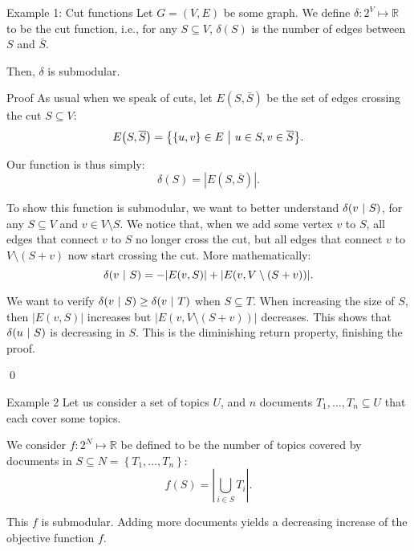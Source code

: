 \documentclass[a4paper]{article}
\begin{document}
\begin{parag}{Example 1: Cut functions}
    Let $G = \left(V, E\right)$ be some graph. We define $\delta: 2^V \mapsto \mathbb{R}$ to be the cut function, i.e., for any $S \subseteq V$, $\delta\left(S\right)$ is the number of edges between $S$ and $\bar{S}$.

    Then, $\delta$ is submodular.

    \begin{subparag}{Proof}
        As usual when we speak of cuts, let $E\left(S, \bar{S}\right)$ be the set of edges crossing the cut $S \subseteq V$: 
        \[E\left(S, \bar{S}\right) = \left\{\left\{u, v\right\} \in E \suchthat u \in S, v \in \bar{S}\right\}.\]
 
        Our function is thus simply: 
        \[\delta\left(S\right) = \left|E\left(S, \bar{S}\right)\right|.\]

        To show this function is submodular, we want to better understand $\delta\left(v \suchthat S\right)$, for any $S \subseteq V$ and $v \in V \setminus S$. We notice that, when we add some vertex $v$ to $S$, all edges that connect $v$ to $S$ no longer cross the cut, but all edges that connect $v$ to $V \setminus \left(S + v\right)$ now start crossing the cut. More mathematically:
        \[\delta\left(v \suchthat S\right) =  - \left|E\left(v, S\right)\right| + \left|E\left(v, V \setminus \left(S + v\right)\right)\right|.\]
        
        We want to verify $\delta\left(v \suchthat S\right) \geq \delta\left(v \suchthat T\right)$ when $S \subseteq T$. When increasing the size of $S$, then $\left|E\left(v, S\right)\right|$ increases but $\left|E\left(v, V \setminus \left(S + v\right)\right)\right|$ decreases. This shows that $\delta\left(u \suchthat S\right)$ is decreasing in $S$. This is the diminishing return property, finishing the proof.

        \qed
    \end{subparag}
\end{parag}

\begin{parag}{Example 2}
    Let us consider a set of topics $U$, and $n$ documents $T_1, \ldots, T_n \subseteq U$ that each cover some topics.

    We consider $f: 2^N \mapsto \mathbb{R}$ be defined to be the number of topics covered by documents in $S \subseteq N = \left\{T_1, \ldots, T_n\right\}$: 
    \[f\left(S\right) = \left|\bigcup_{i \in S} T_i\right|.\]
    
    This $f$ is submodular. Adding more documents yields a decreasing increase of the objective function $f$.
\end{parag}
\end{document}
